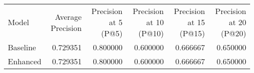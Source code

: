 \begin{tabular}{lrrrrr}
Model & Average Precision & Precision at 5 (P@5) & Precision at 10 (P@10) & Precision at 15 (P@15) & Precision at 20 (P@20) \\
Baseline & 0.729351 & 0.800000 & 0.600000 & 0.666667 & 0.650000 \\
Enhanced & 0.729351 & 0.800000 & 0.600000 & 0.666667 & 0.650000 \\
\end{tabular}
